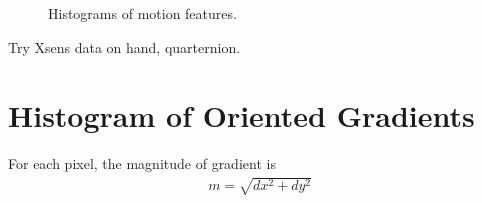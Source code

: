 \begin{figure}[t]
\centering
{}
\caption{Histograms of motion features.}
\end{figure}

Try Xsens data on hand, quarternion.

\section{Histogram of Oriented Gradients}
For each pixel, the magnitude of gradient is 
\begin{align*}
m = \sqrt{dx^2 + dy^2}
\end{align*}

